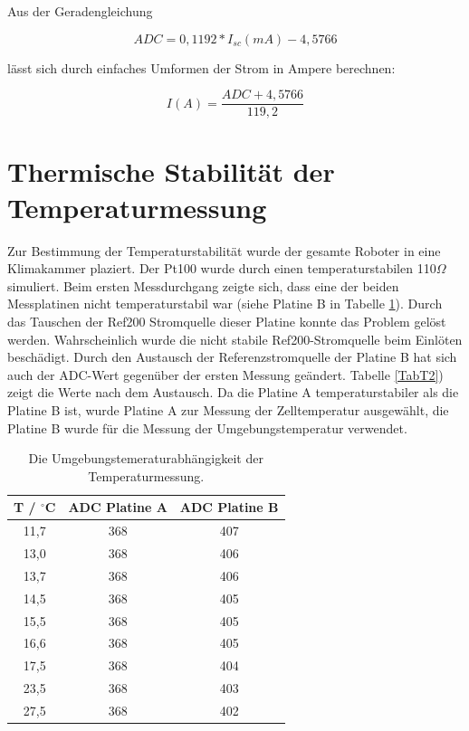 \documentclass[a4paper,bibtotoc,oneside]{scrbook}
\begin{document}
\noindent Aus der Geradengleichung

\begin{equation}
     ADC = 0,1192*I_{sc}(mA) -4,5766 
\end{equation}

\noindent lässt sich durch einfaches Umformen der Strom in Ampere berechnen:

\begin{equation}
     I(A) = \frac{ADC + 4,5766} {119,2} 
\end{equation}
  


\section{Thermische Stabilität der Temperaturmessung}\thispagestyle{empty}
Zur Bestimmung der Temperaturstabilität wurde der gesamte Roboter in eine Klimakammer plaziert. Der Pt100 wurde durch einen temperaturstabilen 110$\Omega$ simuliert.
Beim ersten Messdurchgang zeigte sich, dass eine der beiden Messplatinen nicht temperaturstabil war (siehe Platine B in Tabelle \ref{TabT1}). Durch das Tauschen der Ref200 Stromquelle dieser Platine konnte das Problem gelöst werden. Wahrscheinlich wurde die nicht stabile Ref200-Stromquelle beim Einlöten beschädigt. Durch den Austausch der Referenzstromquelle der Platine B hat sich auch der ADC-Wert gegenüber der ersten Messung geändert. Tabelle \ref{TabT2}) zeigt die Werte nach dem Austausch.
Da die Platine A temperaturstabiler als die Platine B ist, wurde Platine A zur Messung der Zelltemperatur ausgewählt, die Platine B wurde für die Messung der Umgebungstemperatur verwendet. 

\begin{table}[htbp]
\centering
\begin{tabular}{ | c | c | c |}\hline
{\bf T / $^{\circ}$C} & {\bf ADC Platine A} & {\bf ADC Platine B}\\ \hline
\hline
11,7 & 368 & 407\\ \hline
13,0 & 368 & 406\\ \hline
13,7 & 368 & 406\\ \hline
14,5 & 368 & 405\\ \hline
15,5 & 368 & 405\\ \hline
16,6 & 368 & 405\\ \hline
17,5 & 368 & 404\\ \hline
23,5 & 368 & 403\\ \hline
27,5 & 368 & 402\\ \hline
\end{tabular}
\caption{Die Umgebungstemeraturabhängigkeit der Temperaturmessung.}\label{TabT1}
\end{table}
\end{document}
